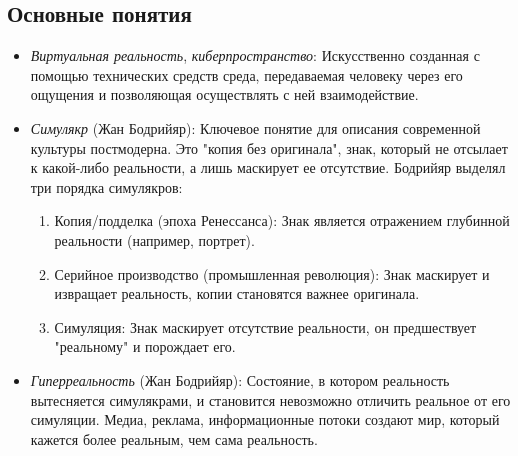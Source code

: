\documentclass[12pt,a4paper]{article}
\begin{document}
	\subsection{Основные понятия}
	\begin{itemize}
		\item \textit{Виртуальная реальность}, \textit{киберпространство}: Искусственно созданная с помощью технических средств среда, передаваемая человеку через его ощущения и позволяющая осуществлять с ней взаимодействие.
		\item \textit{Симулякр} (Жан Бодрийяр): Ключевое понятие для описания современной культуры постмодерна. Это "копия без оригинала", знак, который не отсылает к какой-либо реальности, а лишь маскирует ее отсутствие. Бодрийяр выделял три порядка симулякров:
		\begin{enumerate}
			\item Копия/подделка (эпоха Ренессанса): Знак является отражением глубинной реальности (например, портрет).
			\item Серийное производство (промышленная революция): Знак маскирует и извращает реальность, копии становятся важнее оригинала.
			\item Симуляция: Знак маскирует отсутствие реальности, он предшествует "реальному" и порождает его.
		\end{enumerate}
		\item \textit{Гиперреальность} (Жан Бодрийяр): Состояние, в котором реальность вытесняется симулякрами, и становится невозможно отличить реальное от его симуляции. Медиа, реклама, информационные потоки создают мир, который кажется более реальным, чем сама реальность.
	\end{itemize}
	
\end{document}
